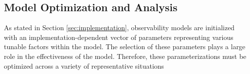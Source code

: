 \subsection{Model Optimization and Analysis}

As stated in Section \ref{sec:implementation}, observability models are initialized with an implementation-dependent vector of parameters representing various tunable factors within the model. The selection of these parameters plays a large role in the effectiveness of the model. Therefore, these parameterizations must be optimized across a variety of representative situations 

\subsubsection{}